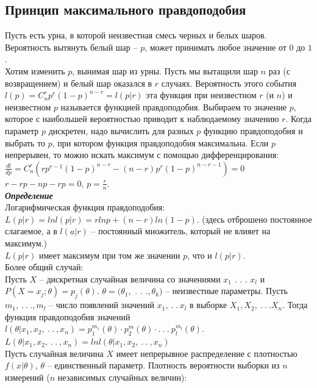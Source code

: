 \documentclass[russian, 12pt, fleqn]{article}
\begin{document}
\subsection{Принцип максимального правдоподобия}
Пусть есть урна, в которой неизвестная смесь черных и белых шаров.\\ Вероятность вытянуть белый шар -- $p$, может принимать любое значение от $0$ до $1$ .\\ 
Хотим изменить $p$, вынимая шар из урны. Пусть мы вытащили шар $n$ раз (с возвращением) и белый шар оказался в $r$ случаях. Вероятность этого события $l(p) = C^r_n p^r (1-p)^{n - r} = l(p|r)$ эта функция при неизвестном $r$ (и $n$) и неизвестном $p$ называется функцией правдоподобия. Выбираем то значение $p$, которое с наибольшей  вероятностью приводит к наблюдаемому значению $r$. Когда параметр $p$ дискретен, надо вычислить для разных $p$ функцию правдоподобия  и выбрать то $p$, при котором функция правдоподобия максимальна.  Если $p$ непрерывен, то можно искать максимум с помощью дифференцирования: $\frac{dl}{dp} = C^r_n (rp^{r - 1}(1-p)^{n - r} - (n - r) p ^ r  (1-p) ^{n - r - 1}) = 0$\\
$r - rp - np - rp = 0$, $p = \frac{r}{n}$.\\
\textit{\textbf{Определение}}\\
Логарифмическая функция правдоподобия: \\$L(p|r) = ln l(p|r) = r ln p + (n-r) ln (1-p)$. (здесь отброшено постоянное слагаемое, а в $l(a|r)$ -- постоянный множитель, который не влияет на максимум.)\\
$L(p|r)$ имеет максимум при том же значении $p$, что и $l(p|r)$.\\
Более общий случай:\\
Пусть $X$ -- дискретная случайная величина со значениями $x_1$ . . . $x_l$ и\\ $P(X=x_j; \theta) = p_j(\theta)$. $\theta = (\theta_1, $ . . .$,\theta_k)$ -- неизвестные параметры. Пусть $m_1, \ .\ .\ .,m_l$ -- число появлений значений $x_1, \ .\ .\ x_l$ в выборке $X_1, X_2, \ .\ .\ . X_n$. Тогда функция правдоподобия  значений $l(\theta | x_1, x_2, \ .\ .\ , x_n) = p_1^{m_1}(\theta) \cdot p_2^m(\theta) \cdot . \ .\ .\ p_l^{m_l}(\theta)$. $ L(\theta | x_1, x_2, \ .\ .\ , x_n) = ln l (\theta | x_1, x_2, \ .\ .\ , x_n) $\\
Пусть случайная величина $X$ имеет непрерывное распределение с плотностью $f(x|\theta)$, $\theta$ -- единственный параметр. Плотность вероятности выборки из $n$ измерений ($n$ независимых случайных величин):\\
\end{document}
